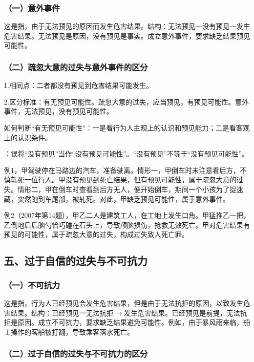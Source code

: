 \subsubsection*{（一）意外事件}

这是指，由于无法预见的原因而发生危害结果。结构：无法预见一没有预见一发生危害结果。无法预见是原因，没有预见是事实。成立意外事件，要求缺乏结果预见可能性。

\subsubsection*{（二）疏忽大意的过失与意外事件的区分}

1.相同点：二者都没有预见到危害结果可能发生。

2.区分标准：有无预见可能性。疏忽大意的过失，应当预见，有预见可能性。意外事件，无法预见，没有预见可能性。

如何判断“有无预见可能性”：一是看行为人主观上的认识和预见能力；二是看客观上的认识条件。

：误将“没有预见”当作“没有预见可能性”。“没有预见”不等于“没有预见可能性”。

例1，甲驾驶停在马路边的汽车，准备驶离。情形一，甲倒车时未注意看后方，不慎轧死一位行人。甲没有预见到死亡结果，但有预见可能性，属于疏忽大意的过失。情形二，甲在倒车时查看到后方无人，便开始倒车，期间一个小孩为了捉迷藏，突然跑到车尾部，被轧死。对此，甲缺乏预见可能性，属于意外事件。

例2（2007年第14题），甲乙二人是建筑工人，在工地上发生口角。甲猛推乙一把，乙倒地后后脑勺恰巧碰在石头上，导致颅脑损伤，抢救无效死亡。甲对危害结果有预见的可能性，属于疏忽大意的过失，构成过失致人死亡罪。

\subsection*{五、过于自信的过失与不可抗力}

\subsubsection*{（一）不可抗力}

这是指，行为人已经预见会发生危害结果，但是由于无法抗拒的原因，以致发生危害结果。结构：已经预见一无法抗拒\ensuremath{\rightarrow}发生危害结果。已经预见是前提，无法抗拒是原因。成立不可抗力，要求缺乏结果避免可能性。例如，由于暴风雨来临，船工操作的客船被打翻，导致乘客落水死亡。

\subsubsection*{（二）过于自信的过失与不可抗力的区分}

